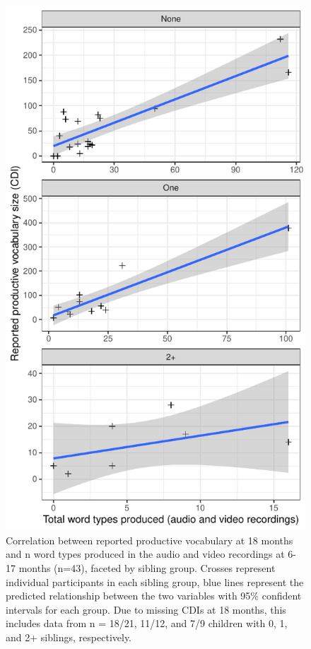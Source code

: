 \documentclass[
  man,mask,floatsintext]{apa6}
\begin{document}
\begin{figure}
\centering
\includegraphics{SiblingsStudy_SupplementaryData-anon-revisions_files/figure-latex/Figure-cdi-types-1.pdf}
\caption{\label{fig:Figure-cdi-types}Correlation between reported productive vocabulary at 18 months and n word types produced in the audio and video recordings at 6-17 months (n=43), faceted by sibling group. Crosses represent individual participants in each sibling group, blue lines represent the predicted relationship between the two variables with 95\% confident intervals for each group. Due to missing CDIs at 18 months, this includes data from n = 18/21, 11/12, and 7/9 children with 0, 1, and 2+ siblings, respectively.}
\end{figure}
\end{document}
